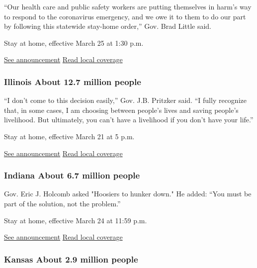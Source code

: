 ``Our health care and public safety workers are putting themselves in
harm's way to respond to the coronavirus emergency, and we owe it to
them to do our part by following this statewide stay-home order,'' Gov.
Brad Little said.

Stay at home, effective March 25 at 1:30 p.m.

\href{https://coronavirus.idaho.gov/statewide-stay-home-order/}{See
announcement} \textbar{}
\href{https://amp.idahostatesman.com/news/coronavirus/article241495446.html}{Read
local coverage}

\hypertarget{illinois-about-127-million-people}{%
\subsubsection{Illinois About 12.7 million
people}\label{illinois-about-127-million-people}}

``I don't come to this decision easily,'' Gov. J.B. Pritzker said. ``I
fully recognize that, in some cases, I am choosing between people's
lives and saving people's livelihood. But ultimately, you can't have a
livelihood if you don't have your life.''

Stay at home, effective March 21 at 5 p.m.

\href{https://www2.illinois.gov/Pages/news-item.aspx?ReleaseID=21288}{See
announcement} \textbar{}
\href{https://www.chicagotribune.com/coronavirus/ct-coronavirus-illinois-shelter-in-place-lockdown-order-20200320-teedakbfw5gvdgmnaxlel54hau-story.html}{Read
local coverage}

\hypertarget{indiana-about-67-million-people}{%
\subsubsection{Indiana About 6.7 million
people}\label{indiana-about-67-million-people}}

Gov. Eric J. Holcomb asked "Hoosiers to hunker down." He added: ``You
must be part of the solution, not the problem.''

Stay at home, effective March 24 at 11:59 p.m.

\href{https://www.in.gov/gov/3232.htm}{See announcement} \textbar{}
\href{https://www.indystar.com/story/news/health/2020/03/23/indiana-coronavirus-updates-indianapolis-covid-19-latest-news/2896967001/}{Read
local coverage}

\hypertarget{kansas-about-29-million-people}{%
\subsubsection{Kansas About 2.9 million
people}\label{kansas-about-29-million-people}}

